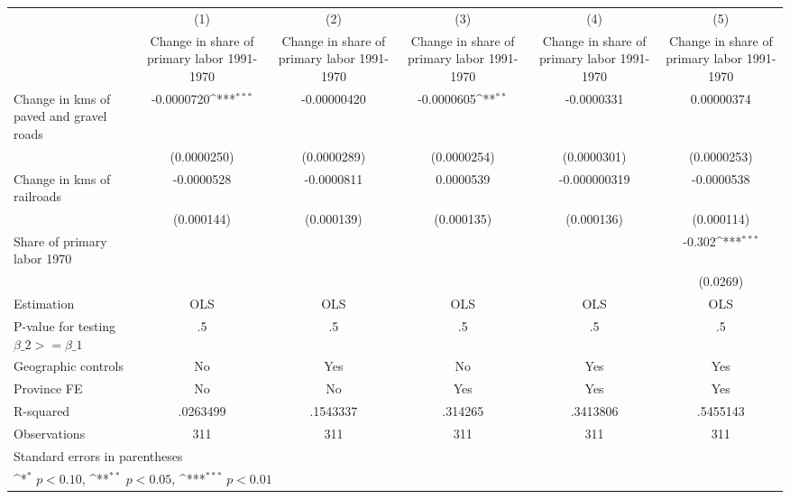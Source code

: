 {
\def\sym#1{\ifmmode^{#1}\else\(^{#1}\)\fi}
\begin{tabular}{l*{5}{c}}
\hline\hline
                    &\multicolumn{1}{c}{(1)}&\multicolumn{1}{c}{(2)}&\multicolumn{1}{c}{(3)}&\multicolumn{1}{c}{(4)}&\multicolumn{1}{c}{(5)}\\
                    &\multicolumn{1}{c}{Change in share of primary labor 1991-1970}&\multicolumn{1}{c}{Change in share of primary labor 1991-1970}&\multicolumn{1}{c}{Change in share of primary labor 1991-1970}&\multicolumn{1}{c}{Change in share of primary labor 1991-1970}&\multicolumn{1}{c}{Change in share of primary labor 1991-1970}\\
\hline
Change in kms of paved and gravel roads&  -0.0000720\sym{***}& -0.00000420         &  -0.0000605\sym{**} &  -0.0000331         &  0.00000374         \\
                    & (0.0000250)         & (0.0000289)         & (0.0000254)         & (0.0000301)         & (0.0000253)         \\
[1em]
Change in kms of railroads&  -0.0000528         &  -0.0000811         &   0.0000539         &-0.000000319         &  -0.0000538         \\
                    &  (0.000144)         &  (0.000139)         &  (0.000135)         &  (0.000136)         &  (0.000114)         \\
[1em]
Share of primary labor 1970&                     &                     &                     &                     &      -0.302\sym{***}\\
                    &                     &                     &                     &                     &    (0.0269)         \\
\hline
Estimation          &         OLS         &         OLS         &         OLS         &         OLS         &         OLS         \\
P-value for testing $\beta\_2 >= \beta\_1$&          .5         &          .5         &          .5         &          .5         &          .5         \\
Geographic controls &          No         &         Yes         &          No         &         Yes         &         Yes         \\
Province FE         &          No         &          No         &         Yes         &         Yes         &         Yes         \\
R-squared           &    .0263499         &    .1543337         &     .314265         &    .3413806         &    .5455143         \\
Observations        &         311         &         311         &         311         &         311         &         311         \\
\hline\hline
\multicolumn{6}{l}{\footnotesize Standard errors in parentheses}\\
\multicolumn{6}{l}{\footnotesize \sym{*} \(p<0.10\), \sym{**} \(p<0.05\), \sym{***} \(p<0.01\)}\\
\end{tabular}
}
